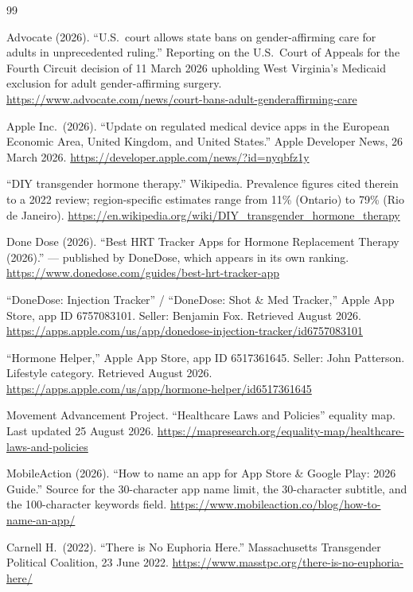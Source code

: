 \documentclass[11pt,a4paper]{article}
\newcommand{\bad}[1]{\obs{#1}}
\begin{document}
\begin{thebibliography}{99}

Advocate (2026). ``U.S.\ court allows state bans on gender-affirming
care for adults in unprecedented ruling.'' Reporting on the U.S.\ Court
of Appeals for the Fourth Circuit decision of 11 March 2026 upholding
West Virginia's Medicaid exclusion for adult gender-affirming surgery.
\url{https://www.advocate.com/news/court-bans-adult-genderaffirming-care}

Apple Inc.\ (2026). ``Update on regulated medical device apps in the
European Economic Area, United Kingdom, and United States.'' Apple
Developer News, 26 March 2026.
\url{https://developer.apple.com/news/?id=nyqbfz1y}

``DIY transgender hormone therapy.'' Wikipedia. Prevalence figures
cited therein to a 2022 review; region-specific estimates range from
11\% (Ontario) to 79\% (Rio de Janeiro).
\url{https://en.wikipedia.org/wiki/DIY_transgender_hormone_therapy}

Done Dose (2026). ``Best HRT Tracker Apps for Hormone Replacement
Therapy (2026).'' \bad{Interested source} --- published by DoneDose,
which appears in its own ranking.
\url{https://www.donedose.com/guides/best-hrt-tracker-app}

``DoneDose: Injection Tracker'' / ``DoneDose: Shot \& Med Tracker,''
Apple App Store, app ID 6757083101. Seller: Benjamin Fox. Retrieved
August 2026.
\url{https://apps.apple.com/us/app/donedose-injection-tracker/id6757083101}

``Hormone Helper,'' Apple App Store, app ID 6517361645. Seller: John
Patterson. Lifestyle category. Retrieved August 2026.
\url{https://apps.apple.com/us/app/hormone-helper/id6517361645}

Movement Advancement Project. ``Healthcare Laws and Policies''
equality map. Last updated 25 August 2026.
\url{https://mapresearch.org/equality-map/healthcare-laws-and-policies}

MobileAction (2026). ``How to name an app for App Store \& Google
Play: 2026 Guide.'' Source for the 30-character app name limit, the
30-character subtitle, and the 100-character keywords field.
\url{https://www.mobileaction.co/blog/how-to-name-an-app/}

Carnell H.\ (2022). ``There is No Euphoria Here.'' Massachusetts
Transgender Political Coalition, 23 June 2022.
\url{https://www.masstpc.org/there-is-no-euphoria-here/}


\end{thebibliography}
\end{document}
